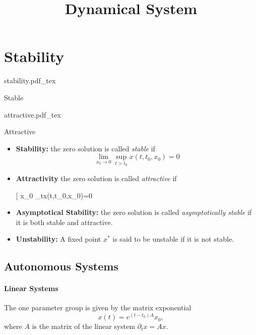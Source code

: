 \documentclass{tufte-handout}
\title{Dynamical System}
\newcommand{\incfig}[1]{%
    \def\svgwidth{\columnwidth}
    {#1.pdf_tex}
}
\begin{document}
\maketitle
\tableofcontents
\section{Stability}
\begin{marginfigure}
    \centering
        \incfig{stability}
	\caption{Stable}
\end{marginfigure}

\begin{marginfigure}
    \centering
		\incfig{attractive}
	\caption{Attractive}
\end{marginfigure}
\begin{definition} 

\begin{itemize}
	\item \textbf{Stability:} the zero solution is called \emph{stable} if 
\[ \lim_{x_0\to 0}\sup_{t > t_0}x(t,t_0,x_0)=0 \]
        \item \textbf{Attractivity} the zero solution is called \emph{attractive} if

		[ \forall x_0  \lim_{t\to\infty}x(t,t_0,x_0)=0 \]
	\item \textbf{Asymptotical Stability:} the zero solution is called \emph{asymptotically stable} if it is both stable and attractive.
	\item \textbf{Unstability:} A fixed point $x^*$ is said to be unstable if it is not stable.
\end{itemize}
\end{definition}
\subsection{Autonomous Systems}
\paragraph{Linear Systems}

The one parameter group is given by the matrix exponential \[ x(t) = e^{(t-t_0)A}x_0, \]
where $A$ is the matrix of the linear system $\partial_t x = Ax$.
\end{document}
